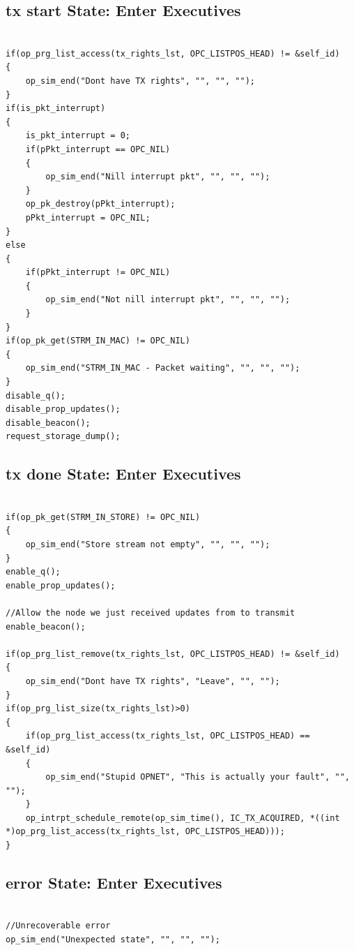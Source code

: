 \subsection{tx start State: Enter Executives}
{\tiny
\begin{verbatim}

if(op_prg_list_access(tx_rights_lst, OPC_LISTPOS_HEAD) != &self_id)
{
	op_sim_end("Dont have TX rights", "", "", "");	
}
if(is_pkt_interrupt)
{
	is_pkt_interrupt = 0;
	if(pPkt_interrupt == OPC_NIL)
	{
		op_sim_end("Nill interrupt pkt", "", "", "");	
	}
	op_pk_destroy(pPkt_interrupt);
	pPkt_interrupt = OPC_NIL;
}
else
{
	if(pPkt_interrupt != OPC_NIL)
	{
		op_sim_end("Not nill interrupt pkt", "", "", "");	
	}
}
if(op_pk_get(STRM_IN_MAC) != OPC_NIL)
{
	op_sim_end("STRM_IN_MAC - Packet waiting", "", "", "");	
}
disable_q();
disable_prop_updates();
disable_beacon();
request_storage_dump();

\end{verbatim}
}

\subsection{tx done State: Enter Executives}
{\tiny
\begin{verbatim}

if(op_pk_get(STRM_IN_STORE) != OPC_NIL)
{
	op_sim_end("Store stream not empty", "", "", "");
}
enable_q();
enable_prop_updates();

//Allow the node we just received updates from to transmit
enable_beacon();

if(op_prg_list_remove(tx_rights_lst, OPC_LISTPOS_HEAD) != &self_id)
{
	op_sim_end("Dont have TX rights", "Leave", "", "");	
}
if(op_prg_list_size(tx_rights_lst)>0)
{
	if(op_prg_list_access(tx_rights_lst, OPC_LISTPOS_HEAD) == &self_id)
	{
		op_sim_end("Stupid OPNET", "This is actually your fault", "", "");	
	}
	op_intrpt_schedule_remote(op_sim_time(), IC_TX_ACQUIRED, *((int *)op_prg_list_access(tx_rights_lst, OPC_LISTPOS_HEAD)));
}

\end{verbatim}
}

\subsection{error State: Enter Executives}
{\tiny
\begin{verbatim}

//Unrecoverable error
op_sim_end("Unexpected state", "", "", "");

\end{verbatim}
}

